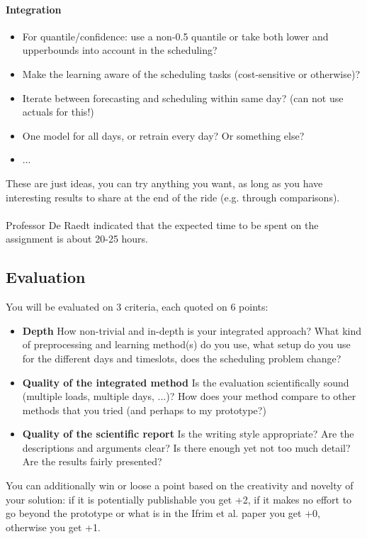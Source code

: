 \documentclass[a4,10pt]{article}
\begin{document}
\paragraph{Integration}
\begin{itemize}
\item For quantile/confidence: use a non-0.5 quantile or take both lower and upperbounds into account in the scheduling?
\item Make the learning aware of the scheduling tasks (cost-sensitive or otherwise)?
\item Iterate between forecasting and scheduling within same day? (can not use actuals for this!)
\item One model for all days, or retrain every day? Or something else?
\item ...
\end{itemize}

These are just ideas, you can try anything you want, as long as you have interesting results to share at the end of the ride (e.g. through comparisons).

\paragraph{}
Professor De Raedt indicated that the expected time to be spent on the assignment is about 20-25 hours.

\subsection*{Evaluation}
You will be evaluated on 3 criteria, each quoted on 6 points:
\begin{itemize}
\item \textbf{Depth} How non-trivial and in-depth is your integrated approach? What kind of preprocessing and learning method(s) do you use, what setup do you use for the different days and timeslots, does the scheduling problem change?
\item \textbf{Quality of the integrated method} Is the evaluation scientifically sound (multiple loads, multiple days, ...)? How does your method compare to other methods that you tried (and perhaps to my prototype?)
\item \textbf{Quality of the scientific report} Is the writing style appropriate? Are the descriptions and arguments clear? Is there enough yet not too much detail? Are the results fairly presented?
\end{itemize}
You can additionally win or loose a point based on the creativity and novelty of your solution: if it is potentially publishable you get +2, if it makes no effort to go beyond the prototype or what is in the Ifrim et al. paper you get +0, otherwise you get +1.
\end{document}
